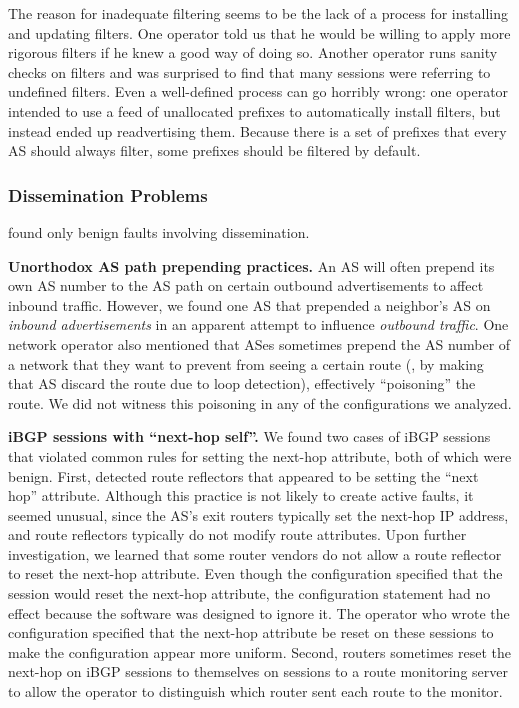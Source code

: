 The reason for inadequate
filtering seems to be the lack of a process
for installing and updating filters. 
One operator told us
that he would be willing to apply more 
rigorous filters if he knew a good way of doing so.  Another operator runs
sanity checks on filters and was surprised to find that many
sessions were referring to undefined filters.   
Even a well-defined process can go horribly wrong: one operator intended
to use a 
feed of unallocated
prefixes to automatically install filters, but instead ended up
readvertising them.
Because there is a set of prefixes that every AS should always filter,
some prefixes should be filtered by default.  



\subsubsection{Dissemination Problems}

\rcc found only benign faults involving dissemination.

{\bf Unorthodox AS path prepending practices.}  An AS will often prepend
its own AS number to the AS path on certain outbound advertisements to
affect inbound traffic.  However, we found one AS that prepended a
neighbor's AS on {\em inbound advertisements} in an apparent attempt to
influence {\em outbound traffic}. One network operator also mentioned
that ASes sometimes prepend the AS number of a network that they want to
prevent from seeing a certain route (\ie, by making that AS discard the
route due to loop detection), effectively ``poisoning'' the route.  We
did not witness this poisoning in any of the configurations we analyzed.

{\bf iBGP sessions with ``next-hop self''.}  We found two cases of iBGP
sessions that violated common rules for setting the next-hop
attribute, both of which were benign.  First, \rcc detected
route reflectors that appeared to be setting the ``next hop''
attribute. Although this practice is not likely to create active faults,
it seemed unusual, since the AS's exit
routers typically set the next-hop IP address, and route reflectors
typically do not modify route attributes.
Upon further investigation, we learned that some router vendors do not
allow a route reflector to reset the next-hop attribute. Even though
the configuration specified that the session would reset the next-hop
attribute, the configuration statement had no effect because the
software was designed to ignore it. The operator who wrote the
configuration specified that the next-hop attribute be reset
on these sessions to make the configuration appear more uniform.
Second, routers sometimes reset the
next-hop on iBGP sessions to themselves on sessions to a route
monitoring server to allow the
operator to distinguish which router sent each route to the monitor.


